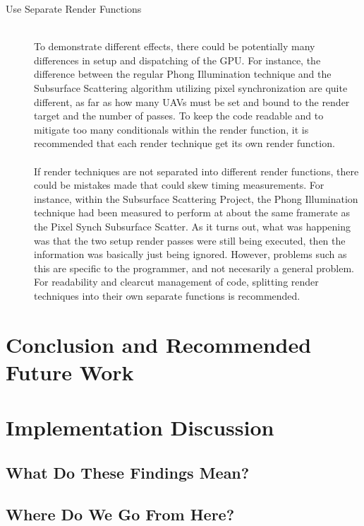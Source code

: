 \documentclass[a4paper, 12pt]{article}
\begin{document}
\begin{description}
\item[Use Separate Render Functions] \hfill \\

To demonstrate different effects, there could be potentially many differences
in setup and dispatching of the GPU. For instance, the difference between the
regular Phong Illumination technique and the Subsurface Scattering algorithm
utilizing pixel synchronization are quite different, as far as how many UAVs
must be set and bound to the render target and the number of passes. To keep
the code readable and to mitigate too many conditionals within the render
function, it is recommended that each render technique get its own render
function. \\ \\ If render techniques are not separated into different render
functions, there could be mistakes made that could skew timing measurements.
For instance, within the Subsurface Scattering Project, the Phong Illumination
technique had been measured to perform at about the same framerate as the
Pixel Synch Subsurface Scatter. As it turns out, what was happening was that
the two setup render passes were still being executed, then the information
was basically just being ignored. However, problems such as this are specific
to the programmer, and not necesarily a general problem. For readability and
clearcut management of code, splitting render techniques into their own
separate functions is recommended.

\end{description}

\pagebreak

\section{Conclusion and Recommended Future Work}

\lipsum[115-119]

\section{Implementation Discussion}
\label{subsection:ImplementationDiscussion}

\lipsum[120-150]

\subsection{What Do These Findings Mean?}

\lipsum[1-19]

\subsection{Where Do We Go From Here?}

\lipsum[20-75]
\end{document}
